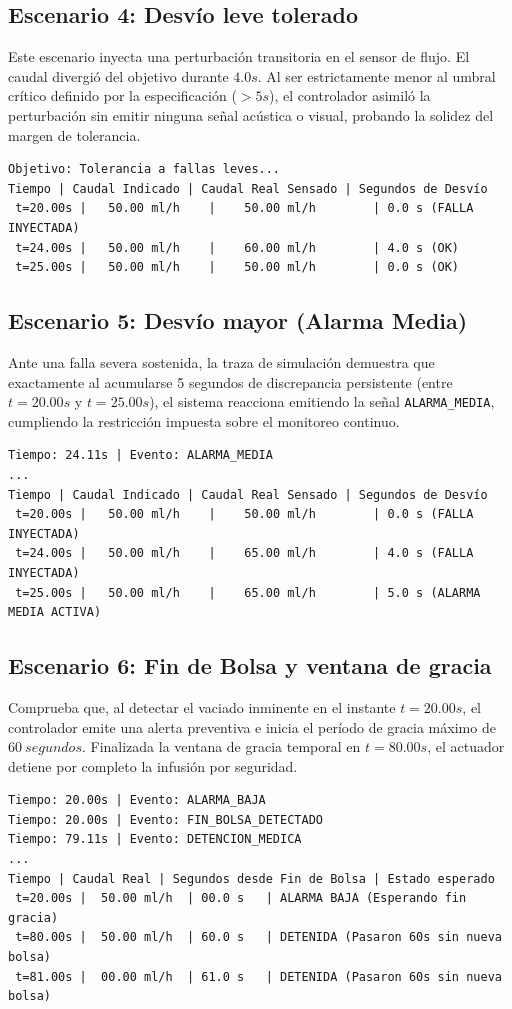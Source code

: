 \subsection{Escenario 4: Desvío leve tolerado}
Este escenario inyecta una perturbación transitoria en el sensor de flujo. El caudal divergió del objetivo durante $4.0s$. Al ser estrictamente menor al umbral crítico definido por la especificación ($>5s$), el controlador asimiló la perturbación sin emitir ninguna señal acústica o visual, probando la solidez del margen de tolerancia.
\begin{verbatim}
Objetivo: Tolerancia a fallas leves...
Tiempo | Caudal Indicado | Caudal Real Sensado | Segundos de Desvío
 t=20.00s |   50.00 ml/h    |    50.00 ml/h        | 0.0 s (FALLA INYECTADA)
 t=24.00s |   50.00 ml/h    |    60.00 ml/h        | 4.0 s (OK)
 t=25.00s |   50.00 ml/h    |    50.00 ml/h        | 0.0 s (OK)
\end{verbatim}

\subsection{Escenario 5: Desvío mayor (Alarma Media)}
Ante una falla severa sostenida, la traza de simulación demuestra que exactamente al acumularse 5 segundos de discrepancia persistente (entre $t=20.00s$ y $t=25.00s$), el sistema reacciona emitiendo la señal \texttt{ALARMA\_MEDIA}, cumpliendo la restricción impuesta sobre el monitoreo continuo.
\begin{verbatim}
Tiempo: 24.11s | Evento: ALARMA_MEDIA
...
Tiempo | Caudal Indicado | Caudal Real Sensado | Segundos de Desvío
 t=20.00s |   50.00 ml/h    |    50.00 ml/h        | 0.0 s (FALLA INYECTADA)
 t=24.00s |   50.00 ml/h    |    65.00 ml/h        | 4.0 s (FALLA INYECTADA)
 t=25.00s |   50.00 ml/h    |    65.00 ml/h        | 5.0 s (ALARMA MEDIA ACTIVA)
\end{verbatim}

\subsection{Escenario 6: Fin de Bolsa y ventana de gracia}
Comprueba que, al detectar el vaciado inminente en el instante $t=20.00s$, el controlador emite una alerta preventiva e inicia el período de gracia máximo de $60~segundos$. Finalizada la ventana de gracia temporal en $t=80.00s$, el actuador detiene por completo la infusión por seguridad.
\begin{verbatim}
Tiempo: 20.00s | Evento: ALARMA_BAJA
Tiempo: 20.00s | Evento: FIN_BOLSA_DETECTADO
Tiempo: 79.11s | Evento: DETENCION_MEDICA
...
Tiempo | Caudal Real | Segundos desde Fin de Bolsa | Estado esperado
 t=20.00s |  50.00 ml/h  | 00.0 s   | ALARMA BAJA (Esperando fin gracia)
 t=80.00s |  50.00 ml/h  | 60.0 s   | DETENIDA (Pasaron 60s sin nueva bolsa)
 t=81.00s |  00.00 ml/h  | 61.0 s   | DETENIDA (Pasaron 60s sin nueva bolsa)
\end{verbatim}

